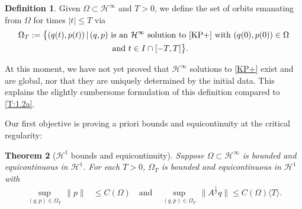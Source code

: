 \documentclass{amsart}
\newcommand{\qtq}[1]{\quad\text{#1}\quad}
\newtheorem{theorem}{Theorem}[section]
\theoremstyle{definition}
\newtheorem{definition}[theorem]{Definition}
\numberwithin{equation}{section}
\renewcommand{\H}{\mathcal H}
\newcommand{\la}{\langle}
\newcommand{\ra}{\rangle}
\begin{document}
\begin{definition}\label{property}
Given $\Omega\subset \H^\infty$ and $T>0$, we define the set of orbits emanating from $\Omega$ for times $|t|\leq T$ via
\begin{align*}
\Omega_T&:= \bigl\{ (q(t),p(t))\,|\, (q,p)\text{ is an $\H^\infty$ solution to \eqref{KP+} with $(q(0), p(0))\in \Omega$}\\
&\qquad\qquad\qquad\qquad\qquad   \text{and $t\in I\cap[-T,T]$}\bigr\}.
\end{align*}
\end{definition}

At this moment, we have not yet proved that $\H^\infty$ solutions to \eqref{KP+} exist and are global, nor that they are uniquely determined by the initial data. This explains the slightly cumbersome formulation of this definition compared to \eqref{T:1.2a}.

Our first objective is proving a priori bounds and equicontinuity at the critical regularity:

\begin{theorem}[$\H^1$ bounds and equicontinuity]\label{T:equicontinuity_H1} Suppose $\Omega \subset \H^\infty$ is bounded and equicontinuous in $\H^1$. For each $T>0$, $\Omega_T$ is bounded and equicontinuous in $\H^1$ with
\begin{align}\label{H1 bdd}
\sup_{(q,p)\in \Omega_T} \,\|p\| &\leq C(\Omega) \qtq{and} \sup_{(q,p)\in \Omega_T} \, \| A^{\frac12} q\| \leq C(\Omega)\la T\ra.
\end{align}
\end{theorem}
\end{document}
